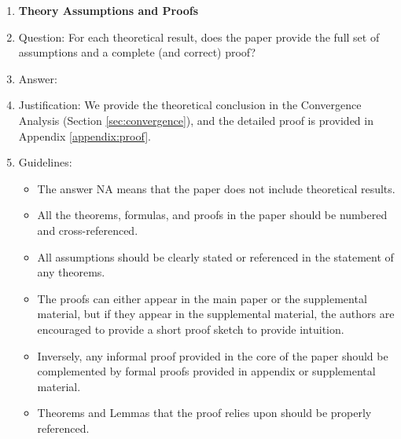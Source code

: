 \documentclass{article}
\theoremstyle{plain}
\theoremstyle{definition}
\theoremstyle{remark}
\begin{document}
\begin{enumerate}
\item {\bf Theory Assumptions and Proofs}
    \item[] Question: For each theoretical result, does the paper provide the full set of assumptions and a complete (and correct) proof?
    \item[] Answer: \answerYes{} %
    \item[] Justification: We provide the theoretical conclusion in the Convergence Analysis (Section \ref{sec:convergence}), and the detailed proof is provided in Appendix \ref{appendix:proof}. 
    \item[] Guidelines:
    \begin{itemize}
        \item The answer NA means that the paper does not include theoretical results. 
        \item All the theorems, formulas, and proofs in the paper should be numbered and cross-referenced.
        \item All assumptions should be clearly stated or referenced in the statement of any theorems.
        \item The proofs can either appear in the main paper or the supplemental material, but if they appear in the supplemental material, the authors are encouraged to provide a short proof sketch to provide intuition. 
        \item Inversely, any informal proof provided in the core of the paper should be complemented by formal proofs provided in appendix or supplemental material.
        \item Theorems and Lemmas that the proof relies upon should be properly referenced. 
    \end{itemize}


\end{enumerate}
\end{document}
